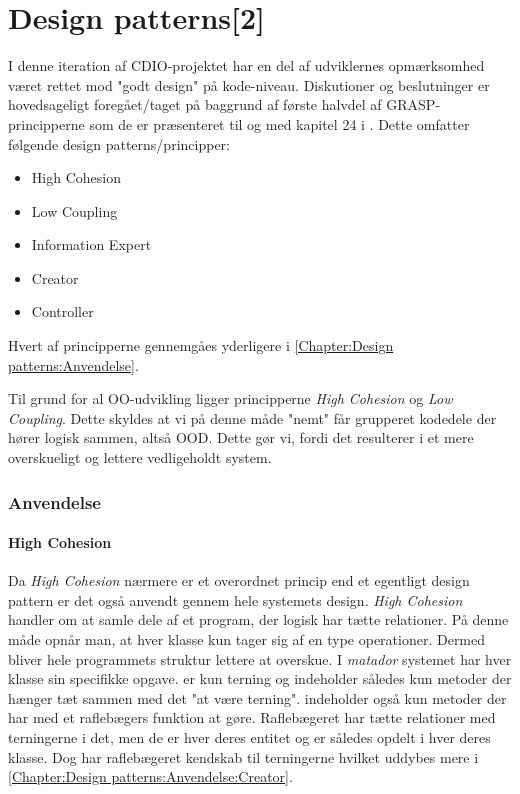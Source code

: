 \chapter{Design patterns[2]}\label{Chapter:Design patterns}
I denne iteration af CDIO-projektet \cite{CDIOdel2} har en del af udviklernes opmærksomhed været rettet mod "godt design" på kode-niveau. Diskutioner og beslutninger er hovedsageligt foregået/taget på baggrund af første halvdel af GRASP-principperne som de er præsenteret til og med kapitel 24 i \cite{umlbook}. Dette omfatter følgende design patterns/principper: 

\begin{itemize}
	\item High Cohesion    
	\item Low Coupling
	\item Information Expert
	\item Creator
	\item Controller
\end{itemize}

Hvert af principperne gennemgåes yderligere i \vref{Chapter:Design patterns:Anvendelse}.

Til grund for al OO-udvikling ligger principperne \textit{High Cohesion} og \textit{Low Coupling}. Dette skyldes at vi på denne måde "nemt" får grupperet kodedele der hører logisk sammen, altså OOD. Dette gør vi, fordi det resulterer i et mere overskueligt og lettere vedligeholdt system. 
 
\subsection{Anvendelse}\label{Chapter:Design patterns:Anvendelse}

\subsubsection{High Cohesion}\label{Chapter:Design patterns:Anvendelse:High Cohesion}
Da \textit{High Cohesion} nærmere er et overordnet princip end et egentligt design pattern er det også anvendt gennem hele systemets design. \textit{High Cohesion} handler om at samle dele af et program, der logisk har tætte relationer. På denne måde opnår man, at hver klasse kun tager sig af en type operationer. Dermed bliver hele programmets struktur lettere at overskue. I \textit{matador} systemet har hver klasse sin specifikke opgave.  er kun terning og indeholder således kun metoder der hænger tæt sammen med det "at være terning".  indeholder også kun metoder der har med et raflebægers funktion at gøre. Raflebægeret har tætte relationer med terningerne i det, men de er hver deres entitet og er således opdelt i hver deres klasse. Dog har raflebægeret kendskab til terningerne hvilket uddybes mere i \vref{Chapter:Design patterns:Anvendelse:Creator}.       

